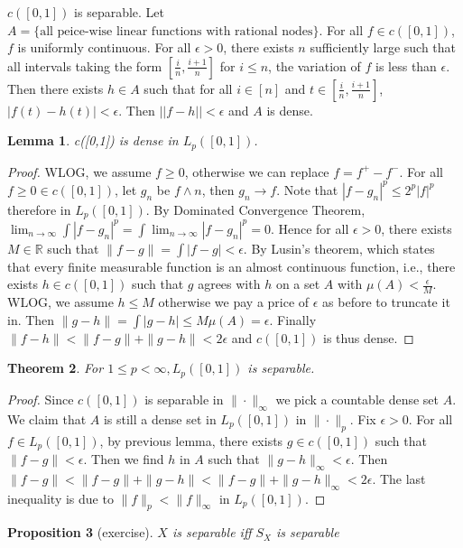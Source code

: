 \documentclass[a4paper, 11pt]{article}
\newcommand{\R}{\mathbb{R}}
\newtheorem{theorem}{Theorem}[section]
\newtheorem{lemma}[theorem]{Lemma}
\newtheorem{proposition}[theorem]{Proposition}
\theoremstyle{definition}
\begin{document}
$c([0,1])$ is separable. Let $A=\{\text{all peice-wise linear functions with rational nodes}\}$. For all $f \in c([0,1])$, $f$ is uniformly continuous. For all $\epsilon>0$, 
there exists $n$ sufficiently large such that all intervals taking the form $[\frac{i}{n}, \frac{i+1}{n}]$ for $i\le n$, the variation of $f$ is less than $\epsilon$.
Then there exists $h\in A$ such that for all $i\in [n]$ and $t\in [\frac{i}{n}, \frac{i+1}{n}]$, $|f(t)-h(t)|<\epsilon$. Then $||f-h||<\epsilon$ and $A$ is dense.
\begin{lemma}
    c([0,1]) is dense in $L_p([0,1])$. 
\end{lemma}
\begin{proof}
    WLOG, we assume $f\ge 0$, otherwise we can replace $f=f^+-f^-$. For all $f\ge 0\in c([0,1])$, let $g_n$ be $f\land n$, then $g_n\to f$.
    Note that $|f-g_n|^p\le 2^p|f|^p$ therefore in $L_p([0,1])$. By Dominated Convergence Theorem, $\lim_{n\to \infty}\int |f-g_n|^p = \int \lim_{n\to \infty}|f-g_n|^p=0$. 
    Hence for all $\epsilon>0$, there exists $M\in \R$ such that $\|f-g\|=\int |f-g|<\epsilon$. By Lusin's theorem, which states that every finite measurable function is an almost 
    continuous function, i.e., there exists $h \in c([0,1])$ such that $g$ agrees with $h$ on a set $A$ with $\mu(A)<\frac{\epsilon}{M}$. WLOG, we assume $h\le M$ otherwise we 
    pay a price of $\epsilon$ as before to truncate it in. Then $\|g-h\|=\int |g-h|\le M\mu(A)=\epsilon$. Finally $\|f-h\|<\|f-g\|+\|g-h\|<2\epsilon$ and $c([0,1])$ is thus dense.
\end{proof}
\begin{theorem}
    For $1\le p <\infty, L_p([0,1])$ is separable.
\end{theorem}
\begin{proof}
    Since $c([0,1])$ is separable in $\|\cdot\|_\infty$ we pick a countable dense set $A$. We claim that $A$ is still a dense set in $L_p([0,1])$ in $\|\cdot\|_p$. 
    Fix $\epsilon>0$. For all $f \in L_p([0,1])$, by previous lemma, there exists  $g \in c([0,1])$ such that $\|f-g\|<\epsilon$. Then we find $h$ in $A$ such that $\|g-h\|_\infty<\epsilon$.
    Then $\|f-g\|<\|f-g\|+\|g-h\|<\|f-g\|+\|g-h\|_\infty<2\epsilon$. The last inequality is due to $\|f\|_p<\|f\|_\infty$ in $L_p([0,1])$.
\end{proof}
\begin{proposition}[exercise]
    $X$ is separable iff $S_X$ is separable
\end{proposition}
\end{document}
